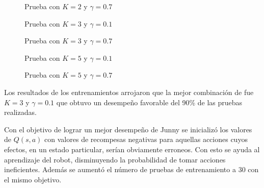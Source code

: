 \begin{figure}[h]
\caption{Prueba  con $K = 2$ y $ \gamma = 0.7 $}
\label{fig:k2y7}
\end{figure} 

\begin{figure}[h]
\caption{Prueba con $K = 3$ y $ \gamma = 0.1 $}
\label{fig:k3y1}
\end{figure} 

\begin{figure}[h]
\caption{Prueba con $K = 3$ y $ \gamma = 0.7 $}
\label{fig:k3y7}
\end{figure} 

\begin{figure}[h]
\caption{Prueba con $K = 5$ y $ \gamma = 0.1 $}
\label{fig:k5y1}
\end{figure} 

\begin{figure}[h]
\caption{Prueba con $K = 5$ y $ \gamma = 0.7 $}
\label{fig:k5y7}
\end{figure} 

Los resultados de los entrenamientos arrojaron que la mejor combinaci\'on de fue $K = 3$ y $ \gamma = 0.1 $ que obtuvo un desempeño favorable del 90\% de las pruebas realizadas.

Con el objetivo de lograr un mejor desempeño de Junny se inicializ\'o los valores de $Q(s,a)$ con valores de recompesas negativas para aquellas acciones cuyos efectos, en un estado particular, serían obviamente erroneos. Con esto se ayuda al aprendizaje del robot, disminuyendo la probabilidad de tomar acciones ineficientes. Adem\'as se aumentó el n\'umero de pruebas de entrenamiento a 30 con el mismo objetivo.

